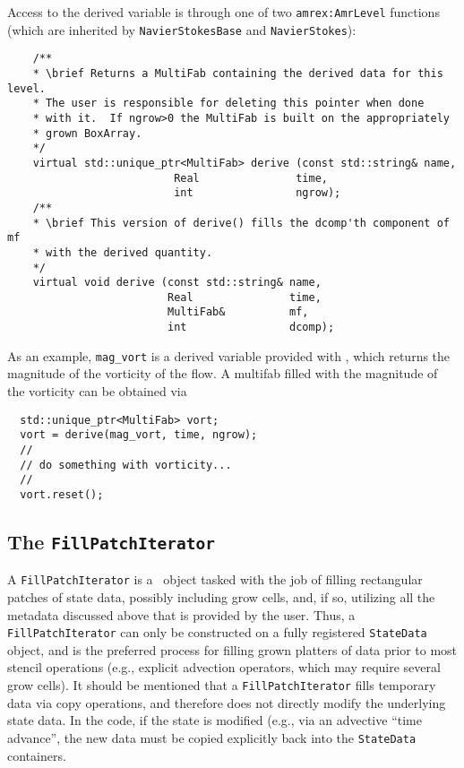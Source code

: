 Access to the derived variable is through one of two {\tt amrex:AmrLevel} functions
(which are inherited by {\tt NavierStokesBase} and {\tt NavierStokes}):
\begin{lstlisting}
    /**
    * \brief Returns a MultiFab containing the derived data for this level.
    * The user is responsible for deleting this pointer when done
    * with it.  If ngrow>0 the MultiFab is built on the appropriately
    * grown BoxArray.
    */
    virtual std::unique_ptr<MultiFab> derive (const std::string& name,
					      Real               time,
					      int                ngrow);
    /**
    * \brief This version of derive() fills the dcomp'th component of mf
    * with the derived quantity.
    */
    virtual void derive (const std::string& name,
                         Real               time,
                         MultiFab&          mf,
                         int                dcomp);
\end{lstlisting}

As an example, {\tt mag\_vort} is a derived variable provided with \iamr, which
returns the magnitude of the vorticity of the flow.
A multifab filled with the magnitude of the vorticity can be obtained via
\begin{lstlisting}
  std::unique_ptr<MultiFab> vort;
  vort = derive(mag_vort, time, ngrow);
  //
  // do something with vorticity...
  //
  vort.reset();  
\end{lstlisting}


\subsection{The {\tt FillPatchIterator}}

A {\tt FillPatchIterator} is a \amrex\ object tasked with the job of
filling rectangular patches of state data, possibly including grow cells,
and, if so, utilizing all the metadata  discussed above that is provided by
the user.  Thus, a {\tt FillPatchIterator} can only be constructed on
a fully registered {\tt StateData} object, and is the preferred 
process for filling grown platters of data prior to most stencil 
operations (e.g., explicit advection operators, which may require 
several grow cells).  It should be mentioned that a {\tt FillPatchIterator}
fills temporary data via copy operations, and therefore does not
directly modify the underlying state data.  In the code, if the state
is modified (e.g., via an advective ``time advance'', the new data
must be copied explicitly back into the {\tt StateData} containers.

